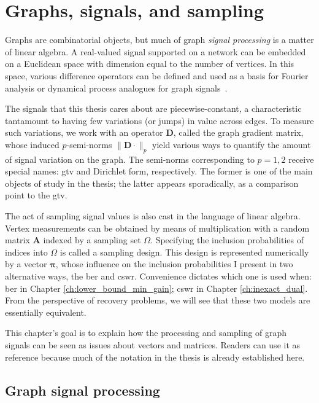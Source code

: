 \chapter{Graphs, signals, and sampling}\label{ch:graphs_signals_sampling}

Graphs are combinatorial objects, but much of graph \emph{signal processing} is a matter of linear algebra. A real-valued signal supported on a network can be embedded on a Euclidean space with dimension equal to the number of vertices. In this space, various difference operators can be defined and used as a basis for Fourier analysis or dynamical process analogues for graph signals~\cite{shuman2013}.

The signals that this thesis cares about are piecewise-constant, a characteristic tantamount to having few variations (or jumps) in value across edges. To measure such variations, we work with an operator $\mathbf{D}$, called the graph gradient matrix, whose induced $p$-semi-norms $\|\mathbf{D} \cdot \|_p$ yield various ways to quantify the amount of signal variation on the graph. The semi-norms corresponding to $p = 1, 2$ receive special names: \acrfull{gtv} and Dirichlet form, respectively. The former is one of the main objects of study in the thesis; the latter appears sporadically, as a comparison point to the \acrshort{gtv}.

The act of sampling signal values is also cast in the language of linear algebra. Vertex measurements can be obtained by means of multiplication with a random matrix $\mathbf{A}$ indexed by a sampling set $\Omega$. Specifying the inclusion probabilities of indices into $\Omega$ is called a sampling design. This design is represented numerically by a vector $\bm{\pi}$, whose influence on the inclusion probabilities I present in two alternative ways, the \acrfull{ber} and \acrfull{cswr}. Convenience dictates which one is used when: \acrshort{ber} in Chapter \ref{ch:lower_bound_min_gain}; \acrshort{cswr} in Chapter \ref{ch:inexact_dual}. From the perspective of recovery problems, we will see that these two models are essentially equivalent.

This chapter's goal is to explain how the processing and sampling of graph signals can be seen as issues about vectors and matrices. Readers can use it as reference because much of the notation in the thesis is already established here.


\section{Graph signal processing}


